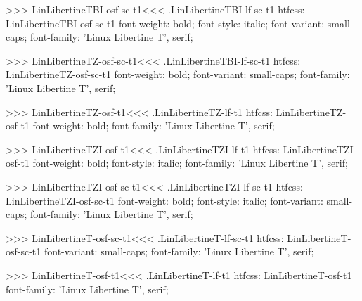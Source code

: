 {{{{{{{>>>
\<LinLibertineTBI-osf-sc-t1\><<<
.LinLibertineTBI-lf-sc-t1
htfcss:  LinLibertineTBI-osf-sc-t1  font-weight: bold; font-style: italic; font-variant: small-caps; font-family: 'Linux Libertine T', serif;

>>>
\<LinLibertineTZ-osf-sc-t1\><<<
.LinLibertineTBI-lf-sc-t1
htfcss:  LinLibertineTZ-osf-sc-t1  font-weight: bold; font-variant: small-caps; font-family: 'Linux Libertine T', serif;

>>>
\<LinLibertineTZ-osf-t1\><<<
.LinLibertineTZ-lf-t1
htfcss:  LinLibertineTZ-osf-t1  font-weight: bold; font-family: 'Linux Libertine T', serif;

>>>
\<LinLibertineTZI-osf-t1\><<<
.LinLibertineTZI-lf-t1
htfcss:  LinLibertineTZI-osf-t1  font-weight: bold; font-style: italic; font-family: 'Linux Libertine T', serif;

>>>
\<LinLibertineTZI-osf-sc-t1\><<<
.LinLibertineTZI-lf-sc-t1
htfcss:  LinLibertineTZI-osf-sc-t1  font-weight: bold; font-style: italic; font-variant: small-caps; font-family: 'Linux Libertine T', serif;

>>>
\<LinLibertineT-osf-sc-t1\><<<
.LinLibertineT-lf-sc-t1
htfcss:  LinLibertineT-osf-sc-t1  font-variant: small-caps; font-family: 'Linux Libertine T', serif;

>>>
\<LinLibertineT-osf-t1\><<<
.LinLibertineT-lf-t1
htfcss:  LinLibertineT-osf-t1  font-family: 'Linux Libertine T', serif;

}}}}}}}
